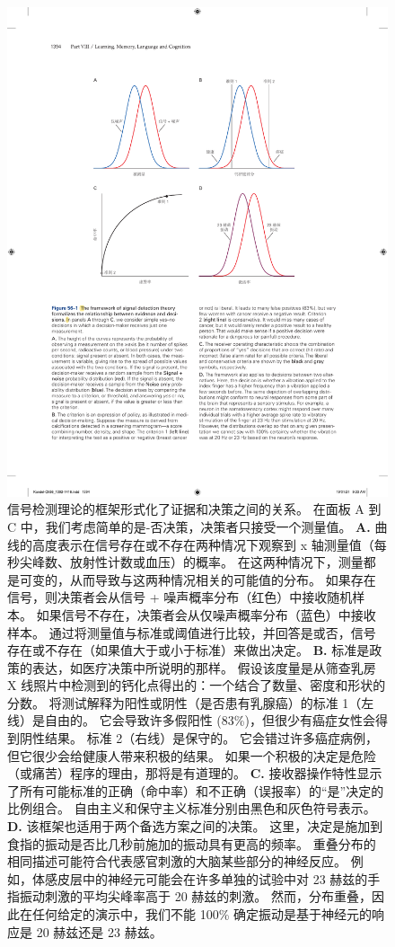 \begin{figure}[htbp]
	\centering
	\includegraphics[width=0.9\linewidth]{chap56/fig_56_1}
	\caption{信号检测理论的框架形式化了证据和决策之间的关系。
		在面板 A 到 C 中，我们考虑简单的是-否决策，决策者只接受一个测量值。
		\textbf{A.} 曲线的高度表示在信号存在或不存在两种情况下观察到 x 轴测量值（每秒尖峰数、放射性计数或血压）的概率。
		在这两种情况下，测量都是可变的，从而导致与这两种情况相关的可能值的分布。
		如果存在信号，则决策者会从信号 + 噪声概率分布（红色）中接收随机样本。
		如果信号不存在，决策者会从仅噪声概率分布（蓝色）中接收样本。
		通过将测量值与标准或阈值进行比较，并回答是或否，信号存在或不存在（如果值大于或小于标准）来做出决定。
		\textbf{B.} 标准是政策的表达，如医疗决策中所说明的那样。 假设该度量是从筛查乳房 X 线照片中检测到的钙化点得出的：一个结合了数量、密度和形状的分数。
		将测试解释为阳性或阴性（是否患有乳腺癌）的标准 1（左线）是自由的。
		它会导致许多假阳性 (83\%)，但很少有癌症女性会得到阴性结果。
		标准 2（右线）是保守的。
		它会错过许多癌症病例，但它很少会给健康人带来积极的结果。
		如果一个积极的决定是危险（或痛苦）程序的理由，那将是有道理的。
		\textbf{C.} 接收器操作特性显示了所有可能标准的正确（命中率）和不正确（误报率）的“是”决定的比例组合。 自由主义和保守主义标准分别由黑色和灰色符号表示。
		\textbf{D.} 该框架也适用于两个备选方案之间的决策。
		这里，决定是施加到食指的振动是否比几秒前施加的振动具有更高的频率。
		重叠分布的相同描述可能符合代表感官刺激的大脑某些部分的神经反应。
		例如，体感皮层中的神经元可能会在许多单独的试验中对 23 赫兹的手指振动刺激的平均尖峰率高于 20 赫兹的刺激。
		然而，分布重叠，因此在任何给定的演示中，我们不能 100\% 确定振动是基于神经元的响应是 20 赫兹还是 23 赫兹。}
	\label{fig:56_1}
\end{figure}



